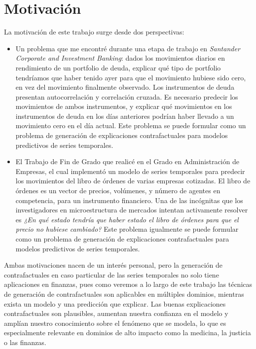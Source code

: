\documentclass[12pt]{report} %
\begin{document}
\chapter{Motivación}
\label{cap:motivacion}

La motivación de este trabajo surge desde dos perspectivas:
\begin{itemize}
    \item Un problema que me encontré durante una etapa de trabajo en \textit{Santander Corporate and Investment Banking}: dados los movimientos diarios en rendimiento de un portfolio de deuda, explicar qué tipo de portfolio tendríamos que haber tenido ayer para que el movimiento hubiese sido cero, en vez del movimiento finalmente observado. Los instrumentos de deuda presentan autocorrelación y correlación cruzada. Es necesario predecir los movimientos de ambos instrumentos, y explicar qué movimientos en los instrumentos de deuda en los días anteriores podrían haber llevado a un movimiento cero en el día actual. Este problema se puede formular como un problema de generación de explicaciones contrafactuales para modelos predictivos de series temporales.
    \item El Trabajo de Fin de Grado que realicé en el Grado en Administración de Empresas, el cual implementó un modelo de series temporales para predecir los movimientos del libro de órdenes de varias empresas cotizadas. El libro de órdenes es un vector de precios, volúmenes, y número de agentes en competencia, para un instrumento financiero. Una de las incógnitas que los investigadores en microestructura de mercados intentan activamente resolver es \textit{¿En qué estado tendría que haber estado el libro de órdenes para que el precio no hubiese cambiado?} Este problema igualmente se puede formular como un problema de generación de explicaciones contrafactuales para modelos predictivos de series temporales.
\end{itemize}

Ambas motivaciones nacen de un interés personal, pero la generación de contrafactuales en caso particular de las series temporales no solo tiene aplicaciones en finanzas, pues como veremos a lo largo de este trabajo las técnicas de generación de contrafactuales son aplicables en múltiples dominios, mientras exista un modelo y una predicción que explicar. Las buenas explicaciones contrafactuales son plausibles, aumentan nuestra confianza en el modelo y amplían nuestro conocimiento sobre el fenómeno que se modela, lo que es especialmente relevante en dominios de alto impacto como la medicina, la justicia o las finanzas.
\end{document}
